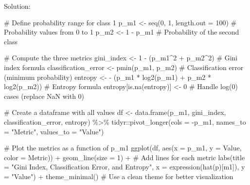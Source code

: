 \documentclass[
]{article}
\newenvironment{Shaded}{\begin{snugshade}}{\end{snugshade}}
\newcommand{\AttributeTok}[1]{\textcolor[rgb]{0.40,0.45,0.13}{#1}}
\newcommand{\CommentTok}[1]{\textcolor[rgb]{0.37,0.37,0.37}{#1}}
\newcommand{\DecValTok}[1]{\textcolor[rgb]{0.68,0.00,0.00}{#1}}
\newcommand{\FunctionTok}[1]{\textcolor[rgb]{0.28,0.35,0.67}{#1}}
\newcommand{\NormalTok}[1]{\textcolor[rgb]{0.00,0.23,0.31}{#1}}
\newcommand{\OtherTok}[1]{\textcolor[rgb]{0.00,0.23,0.31}{#1}}
\newcommand{\SpecialCharTok}[1]{\textcolor[rgb]{0.37,0.37,0.37}{#1}}
\newcommand{\StringTok}[1]{\textcolor[rgb]{0.13,0.47,0.30}{#1}}
\begin{document}
Solution:

\begin{Shaded}
\begin{Highlighting}[]
\CommentTok{\# Define probability range for class 1}
\NormalTok{p\_m1 }\OtherTok{\textless{}{-}} \FunctionTok{seq}\NormalTok{(}\DecValTok{0}\NormalTok{, }\DecValTok{1}\NormalTok{, }\AttributeTok{length.out =} \DecValTok{100}\NormalTok{)  }\CommentTok{\# Probability values from 0 to 1}
\NormalTok{p\_m2 }\OtherTok{\textless{}{-}} \DecValTok{1} \SpecialCharTok{{-}}\NormalTok{ p\_m1  }\CommentTok{\# Probability of the second class}

\CommentTok{\# Compute the three metrics}
\NormalTok{gini\_index }\OtherTok{\textless{}{-}} \DecValTok{1} \SpecialCharTok{{-}}\NormalTok{ (p\_m1}\SpecialCharTok{\^{}}\DecValTok{2} \SpecialCharTok{+}\NormalTok{ p\_m2}\SpecialCharTok{\^{}}\DecValTok{2}\NormalTok{)  }\CommentTok{\# Gini index formula}
\NormalTok{classification\_error }\OtherTok{\textless{}{-}} \FunctionTok{pmin}\NormalTok{(p\_m1, p\_m2)  }\CommentTok{\# Classification error (minimum probability)}
\NormalTok{entropy }\OtherTok{\textless{}{-}} \SpecialCharTok{{-}}\NormalTok{ (p\_m1 }\SpecialCharTok{*} \FunctionTok{log2}\NormalTok{(p\_m1) }\SpecialCharTok{+}\NormalTok{ p\_m2 }\SpecialCharTok{*} \FunctionTok{log2}\NormalTok{(p\_m2))  }\CommentTok{\# Entropy formula}
\NormalTok{entropy[}\FunctionTok{is.na}\NormalTok{(entropy)] }\OtherTok{\textless{}{-}} \DecValTok{0}  \CommentTok{\# Handle log(0) cases (replace NaN with 0)}

\CommentTok{\# Create a dataframe with all values}
\NormalTok{df }\OtherTok{\textless{}{-}} \FunctionTok{data.frame}\NormalTok{(p\_m1, gini\_index, classification\_error, entropy) }\SpecialCharTok{\%\textgreater{}\%}
\NormalTok{  tidyr}\SpecialCharTok{::}\FunctionTok{pivot\_longer}\NormalTok{(}\AttributeTok{cols =} \SpecialCharTok{{-}}\NormalTok{p\_m1, }\AttributeTok{names\_to =} \StringTok{"Metric"}\NormalTok{, }\AttributeTok{values\_to =} \StringTok{"Value"}\NormalTok{)}

\CommentTok{\# Plot the metrics as a function of p\_m1}
\FunctionTok{ggplot}\NormalTok{(df, }\FunctionTok{aes}\NormalTok{(}\AttributeTok{x =}\NormalTok{ p\_m1, }\AttributeTok{y =}\NormalTok{ Value, }\AttributeTok{color =}\NormalTok{ Metric)) }\SpecialCharTok{+}
  \FunctionTok{geom\_line}\NormalTok{(}\AttributeTok{size =} \DecValTok{1}\NormalTok{) }\SpecialCharTok{+}  \CommentTok{\# Add lines for each metric}
  \FunctionTok{labs}\NormalTok{(}\AttributeTok{title =} \StringTok{"Gini Index, Classification Error, and Entropy"}\NormalTok{,}
       \AttributeTok{x =} \FunctionTok{expression}\NormalTok{(}\FunctionTok{hat}\NormalTok{(p)[m1]), }\AttributeTok{y =} \StringTok{"Value"}\NormalTok{) }\SpecialCharTok{+}
  \FunctionTok{theme\_minimal}\NormalTok{()  }\CommentTok{\# Use a clean theme for better visualization}
\end{Highlighting}
\end{Shaded}
\end{document}
